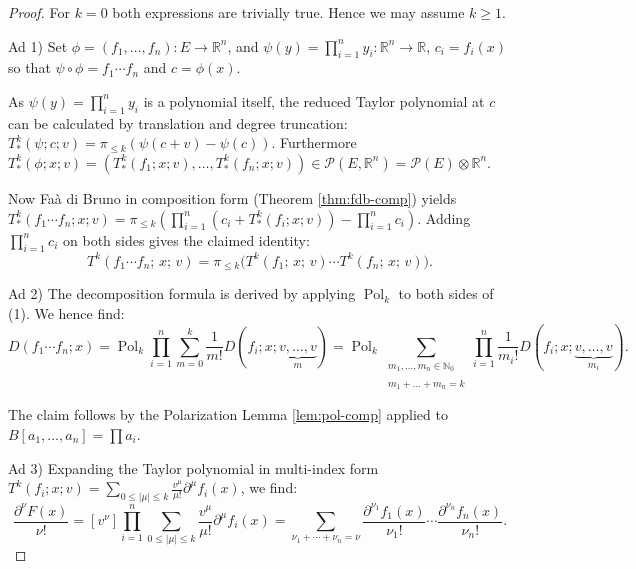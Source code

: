 \documentclass[10pt,a4paper]{article}
\theoremstyle{plain}
\theoremstyle{definition}
\newcommand{\IR}{\mathbb{R}} %
\newcommand{\IN}{\mathbb{N}} %
\newcommand{\del}{\partial} %
\newcommand{\1}{\mathbb{1}} %
\newcommand{\ra}{\rightarrow} %
\newcommand{\tensor}{\otimes} %
\newcommand{\ssum}[1]{\sum_{\substack{#1}}} %
\DeclareMathOperator{\Pol}{Pol} %
\begin{document}
\begin{proof}

For \(k = 0\) both expressions are trivially true. Hence we may assume
\(k \geq 1\).

Ad 1) Set \(\phi = (f_1,\dots,f_n): E \ra \IR^n\), and
\(\psi(y) = \prod_{i=1}^n y_i: \IR^n \ra \IR\), \(c_i = f_i(x)\) so that
\(\psi \circ \phi = f_1\cdots f_n\) and \(c = \phi(x)\).

As \(\psi(y) = \prod_{i=1}^n y_i\) is a polynomial itself, the reduced
Taylor polynomial at \(c\) can be calculated by translation and degree
truncation:
\(T_{\ast}^k(\psi; c; v) = \pi_{\leq k} (\psi(c + v) - \psi(c))\).
Furthermore
\(T_{\ast}^k(\phi; x; v) = (T_{\ast}^k(f_1; x; v), \dots, T_{\ast}^k(f_n; x; v)) \in \mathcal{P}(E,\IR^n)=\mathcal{P}(E)\tensor \IR^n\).

Now Faà di Bruno in composition form (Theorem \ref{thm:fdb-comp}) yields
\(T_{\ast}^k(f_1 \cdots f_n; x; v) =  \pi_{\leq k} (\prod_{i=1}^n (c_i + T_{\ast}^k(f_i; x; v)) - \prod_{i=1}^n c_i)\).
Adding \(\prod_{i=1}^n c_i\) on both sides gives the claimed identity:
\[
      T^k(f_1 \cdots f_n;\, x;\, v) = \pi_{\leq k}\bigl(T^k(f_1;\, x;\, v) \cdots T^k(f_n;\, x;\, v)\bigr).
\]

Ad 2) The decomposition formula is derived by applying \(\Pol_k\) to
both sides of (1). We hence find: \[
    D(f_1 \cdots f_n; x)
  =
    \Pol_k \prod_{i=1}^n \sum_{m=0}^k \frac{1}{m!} D(f_i; x; \underbrace{v,\dots,v}_{m})
  =
    \Pol_k \ssum{m_1,\dots,m_n \in \IN_0 \\\\ m_1 + \dots + m_n = k} \prod_{i=1}^n  \frac{1}{m_i!} D(f_i; x; \underbrace{v,\dots,v}_{m_i}).
\]

The claim follows by the Polarization Lemma \ref{lem:pol-comp} applied
to \(B[a_1,\dots,a_n] = \prod a_i\).

Ad 3) Expanding the Taylor polynomial in multi-index form
\(T^k(f_i; x; v) = \sum_{0 \leq |\mu| \leq k} \frac{v^\mu}{\mu!} \del^\mu f_i(x)\),
we find: \[
\frac{\del^\nu F(x)}{\nu!} 
= [v^\nu] \prod_{i=1}^n \sum_{0 \leq |\mu| \leq k} \frac{v^\mu}{\mu!} \del^\mu f_i(x) 
= \sum_{\nu_1 + \cdots + \nu_n = \nu} \frac{\del^{\nu_1} f_1(x)}{\nu_1!} \cdots \frac{\del^{\nu_n} f_n(x)}{\nu_n!}.
\]

\end{proof}




\end{document}
